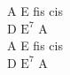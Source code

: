 \begin{chord}
    \begin{footTwelve}
    A E fis cis\\
    D $\mathrm{E^{7}}$ A\\
    A E fis cis\\
    D $\mathrm{E^{7}}$ A\\
\end{footTwelve}
\end{chord}
